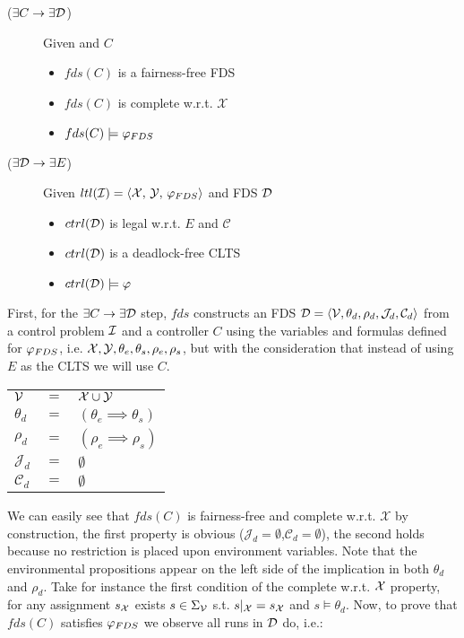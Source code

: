\begin{description}
	\item[($\exists C \rightarrow \exists \mathcal{D}$)] Given \controlProblemDef and $C$
		\begin{itemize}
			\item $fds(C)$ is a fairness-free FDS			
			\item $fds(C)$ is complete w.r.t. $\mathcal{X}$
			\item $fds(C) \models \varphi_{FDS}$
		\end{itemize}
	\item[($\exists \mathcal{D} \rightarrow \exists E$)] Given $\fdsEmbeddingDef$ and FDS $\mathcal{D}$
		\begin{itemize}
			\item $ctrl(\mathcal{D})$ is legal w.r.t. $E$ and $\mathcal{C}$
			\item $ctrl(\mathcal{D})$ is a deadlock-free CLTS			
			\item $ctrl(\mathcal{D}) \models \varphi$
		\end{itemize}	
\end{description}

First,  for the $\exists C \rightarrow \exists \mathcal{D}$ step, $fds$ constructs an FDS $\mathcal{D}=\langle \mathcal V, \theta_d, \rho_d, \mathcal{J}_d, \mathcal{C}_d \rangle$ from a control problem $\mathcal{I}$ and a controller $C$ using the variables and formulas defined for $\varphi_{FDS}$, i.e. ${\mathcal{X}}, {\mathcal{Y}}, {\theta_e}, {\theta_s}, {\rho_e}, {\rho_s}$, but with the consideration that instead of using $E$ as the CLTS we will use $C$.

\begin{tabular}{ l c l }
	${\mathcal{V}}$ & $=$ & ${\mathcal{X}} \cup {\mathcal{Y}}$\\	
	$\theta_d$ & $=$ & $(\theta_e \implies \theta_s)$\\
	$\rho_d$ & $=$ & $(\rho_e \implies \rho_s)$\\	
	$\mathcal{J}_d$ & $=$ & $\emptyset$\\
	$\mathcal{C}_d$ & $=$ & $\emptyset$\\
\end{tabular}

We can easily see that $fds(C)$ is fairness-free and complete w.r.t. $\mathcal{X}$ by construction, the first property is obvious ($\mathcal{J}_d=\emptyset$,$\mathcal{C}_d=\emptyset$), the second holds because no restriction is placed upon environment variables. Note that the environmental propositions appear on the left side of the implication in both $\theta_d$ and $\rho_d$. Take for instance the first condition of the complete w.r.t. ${\mathcal{X}}$ property, for any assignment $s_{{\mathcal{X}}}$ exists $s \in \Sigma_{{\mathcal{V}}}$ s.t. $s|_{{\mathcal{X}}}=s_{{\mathcal{X}}}$ and $s \models \theta_d$. Now, to prove that $fds(C)$ satisfies $\varphi_{FDS}$ we observe all runs in $\mathcal{D}$ do, i.e.: 

